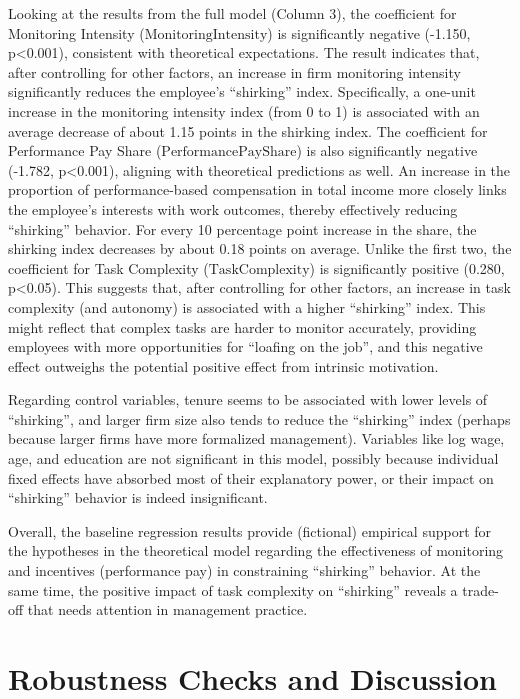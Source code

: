 Looking at the results from the full model (Column 3), the coefficient for {Monitoring Intensity (\(\text{MonitoringIntensity}\))} is significantly negative (-1.150, p<0.001), consistent with theoretical expectations. The result indicates that, after controlling for other factors, an increase in firm monitoring intensity significantly reduces the employee's \enquote{shirking} index. Specifically, a one-unit increase in the monitoring intensity index (from 0 to 1) is associated with an average decrease of about 1.15 points in the shirking index. The coefficient for {Performance Pay Share (\(\text{PerformancePayShare}\))} is also significantly negative (-1.782, p<0.001), aligning with theoretical predictions as well. An increase in the proportion of performance-based compensation in total income more closely links the employee's interests with work outcomes, thereby effectively reducing \enquote{shirking} behavior. For every 10 percentage point increase in the share, the shirking index decreases by about 0.18 points on average. Unlike the first two, the coefficient for {Task Complexity (\(\text{TaskComplexity}\))} is significantly positive (0.280, p<0.05). This suggests that, after controlling for other factors, an increase in task complexity (and autonomy) is associated with a higher \enquote{shirking} index. This might reflect that complex tasks are harder to monitor accurately, providing employees with more opportunities for \enquote{loafing on the job}, and this negative effect outweighs the potential positive effect from intrinsic motivation.

Regarding control variables, tenure seems to be associated with lower levels of \enquote{shirking}, and larger firm size also tends to reduce the \enquote{shirking} index (perhaps because larger firms have more formalized management). Variables like log wage, age, and education are not significant in this model, possibly because individual fixed effects have absorbed most of their explanatory power, or their impact on \enquote{shirking} behavior is indeed insignificant.

Overall, the baseline regression results provide (fictional) empirical support for the hypotheses in the theoretical model regarding the effectiveness of monitoring and incentives (performance pay) in constraining \enquote{shirking} behavior. At the same time, the positive impact of task complexity on \enquote{shirking} reveals a trade-off that needs attention in management practice.

\section{Robustness Checks and Discussion}\label{sec:empirical_robustness}

